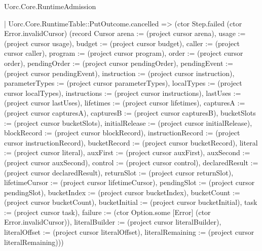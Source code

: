 \begin{lexlean}{Uorc.Core.RuntimeAdmission}
\begin{semanticmodule}
{      | Uorc.Core.RuntimeTable::PutOutcome.cancelled => (ctor Step.failed (ctor Error.invalidCursor) (record Cursor {arena := (project cursor arena), usage := (project cursor usage), budget := (project cursor budget), caller := (project cursor caller), program := (project cursor program), order := (project cursor order), pendingOrder := (project cursor pendingOrder), pendingEvent := (project cursor pendingEvent), instruction := (project cursor instruction), parameterTypes := (project cursor parameterTypes), localTypes := (project cursor localTypes), instructions := (project cursor instructions), lastUses := (project cursor lastUses), lifetimes := (project cursor lifetimes), capturesA := (project cursor capturesA), capturesB := (project cursor capturesB), bucketSlots := (project cursor bucketSlots), initialRelease := (project cursor initialRelease), blockRecord := (project cursor blockRecord), instructionRecord := (project cursor instructionRecord), bucketRecord := (project cursor bucketRecord), literal := (project cursor literal), auxFirst := (project cursor auxFirst), auxSecond := (project cursor auxSecond), control := (project cursor control), declaredResult := (project cursor declaredResult), returnSlot := (project cursor returnSlot), lifetimeCursor := (project cursor lifetimeCursor), pendingSlot := (project cursor pendingSlot), bucketIndex := (project cursor bucketIndex), bucketCount := (project cursor bucketCount), bucketInitial := (project cursor bucketInitial), task := (project cursor task), failure := (ctor Option.some [Error] (ctor Error.invalidCursor)), literalBuilder := (project cursor literalBuilder), literalOffset := (project cursor literalOffset), literalRemaining := (project cursor literalRemaining)}))
}
\end{semanticmodule}
\end{lexlean}
